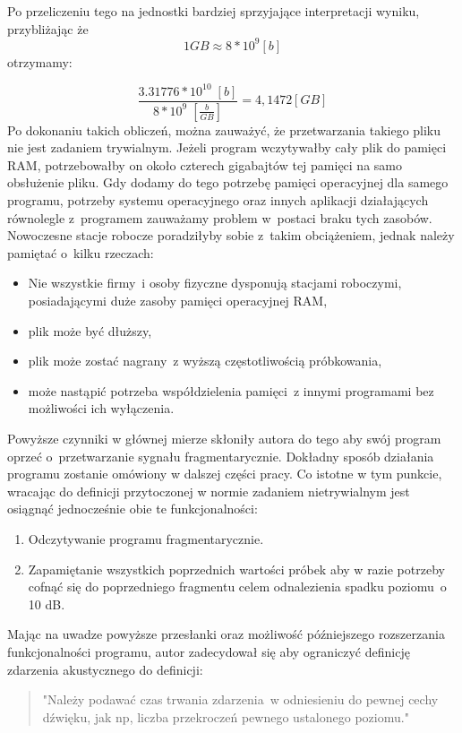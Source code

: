 \documentclass[eng,printmode]{mgr}
\begin{document}
Po przeliczeniu tego na jednostki bardziej sprzyjające interpretacji wyniku, przybliżając że $$1GB \approx 8*10^9 [b]$$ otrzymamy:


\begin{equation}
\frac{3.31776*10^10\;[b]}{8*10^9\;[\frac{b}{GB}]} = 4,1472 [GB]
\end{equation}
Po dokonaniu takich obliczeń, można zauważyć, że przetwarzania takiego pliku nie jest zadaniem trywialnym. Jeżeli program wczytywałby cały plik do pamięci RAM, potrzebowałby on około czterech gigabajtów tej pamięci na samo obsłużenie pliku. Gdy dodamy do tego potrzebę pamięci operacyjnej dla samego programu, potrzeby systemu operacyjnego oraz innych aplikacji działających równolegle z~programem zauważamy problem w~postaci braku tych zasobów. Nowoczesne stacje robocze poradziłyby sobie z~takim obciążeniem, jednak należy pamiętać o~kilku rzeczach:
\begin{itemize}
\item Nie wszystkie firmy~i osoby fizyczne dysponują stacjami roboczymi, posiadającymi duże zasoby pamięci operacyjnej RAM,
\item plik może być dłuższy,
\item plik może zostać nagrany~z wyższą częstotliwością próbkowania,
\item może nastąpić potrzeba współdzielenia pamięci~z innymi programami bez możliwości ich wyłączenia.
\end{itemize}

Powyższe czynniki w głównej mierze skłoniły autora do tego aby swój program oprzeć o~przetwarzanie sygnału fragmentarycznie. Dokładny sposób działania programu zostanie omówiony w dalszej części pracy. Co istotne w tym punkcie, wracając do definicji przytoczonej w normie \cite{PN-ISO-1996-1:2006} zadaniem nietrywialnym jest osiągnąć jednocześnie obie te funkcjonalności:
\begin{enumerate}
\item Odczytywanie programu fragmentarycznie.
\item Zapamiętanie wszystkich poprzednich wartości próbek aby w razie potrzeby cofnąć się do poprzedniego fragmentu celem odnalezienia spadku poziomu~o 10 dB.
\end{enumerate}

Mając na uwadze powyższe przesłanki oraz możliwość późniejszego rozszerzania funkcjonalności programu, autor zadecydował się aby ograniczyć definicję zdarzenia akustycznego do definicji:

\begin{quote}
"Należy podawać czas trwania zdarzenia~w odniesieniu do pewnej cechy dźwięku, jak np, liczba przekroczeń pewnego ustalonego poziomu."\cite{PN-ISO-1996-1:2006}
\end{quote}
\end{document}
